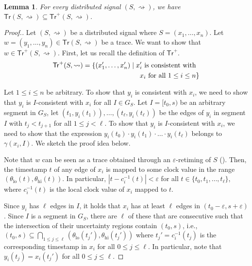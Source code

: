 \documentclass[iicol,lineno]{sn-jnl}
\newcommand{\hb}{\rightsquigarrow}
\newcommand{\tr}{\mathsf{Tr}}
\newcommand{\?}{\text{?}}
\newcommand{\suchthat}{\;\ifnum\currentgrouptype=16 \middle\fi|\;}
\let\st\suchthat
\newtheorem{lemma}{Lemma}
\begin{document}
	\begin{lemma} \label{cl:trsound}
		For every distributed signal $(S,{\hb})$, we have $\tr(S,{\hb}) \subseteq \tr^+(S,{\hb})$.
	\end{lemma}
	\begin{proof}[\normalsize Proof.]
		\normalsize
		Let $(S,{\hb})$ be a distributed signal where $S = (x_1, \ldots, x_n)$.
		Let $w = (y_1, \ldots, y_n) \in \tr(S,{\hb})$ be a trace.
		We want to show that $w \in \tr^+(S,{\hb})$.
		First, let us recall the definition of $\tr^+$.
		\begin{align*}
			\tr^+(S,{\hb}) = \{ (x_1', \ldots, x_n') \st \text{$x_i'$ is consistent with}&\\
			\text{$x_i$ for all $1 \leq i \leq n$}&\} 
		\end{align*}
		
		Let $1 \leq i \leq n$ be arbitrary.
		To show that $y_i$ is consistent with $x_i$, we need to show that $y_i$ is $I$-consistent with $x_i$ for all $I \in G_S$.
		Let $I = [t_0, s)$ be an arbitrary segment in $G_S$, let $(t_1, y_i(t_1)), \ldots, (t_\ell, y_i(t_\ell))$ be the edges of $y_i$ in segment $I$ with $t_j < t_{j+1}$ for all $1 \leq j < \ell$.
		To show that $y_i$ is $I$-consistent with $x_i$, we need to show that the expression $y_i(t_0) \cdot y_i(t_1) \cdot \ldots \cdot y_i(t_\ell)$ belongs to $\gamma(x_i,I)$.
		We sketch the proof idea below.
		
		Note that $w$ can be seen as a trace obtained through an $\varepsilon$-retiming of $S$ (\cite[Section 4.2]{MomtazAB23}).
		Then, the timestamp $t$ of any edge of $x_i$ is mapped to some clock value in the range $(\theta_{\text{lo}}(t), \theta_{\text{hi}}(t))$.
		In particular, $|t - c^{-1}_i(t)| < \varepsilon$ for all $t \in \{t_0, t_1, \ldots, t_\ell\}$, where $c^{-1}_i(t)$ is the local clock value of $x_i$ mapped to $t$.
		
		Since $y_i$ has $\ell$ edges in $I$, it holds that $x_i$ has at least $\ell$ edges in $(t_0 - \varepsilon, s + \varepsilon)$.
		Since $I$ is a segment in $G_S$, there are $\ell$ of these that are consecutive such that the intersection of their uncertainty regions contain $(t_0,s)$, i.e., $(t_0,s) \subseteq \bigcap_{1 \leq j \leq \ell} (\theta_{\text{lo}}(t_j'), \theta_{\text{hi}}(t_j'))$ where $t_j' = c^{-1}_i(t_j)$ is the corresponding timestamp in $x_i$ for all $0 \leq j \leq \ell$.
		In particular, note that $y_i(t_j) = x_i(t_j')$ for all $0 \leq j \leq \ell$.
		

\end{proof}
\end{document}
